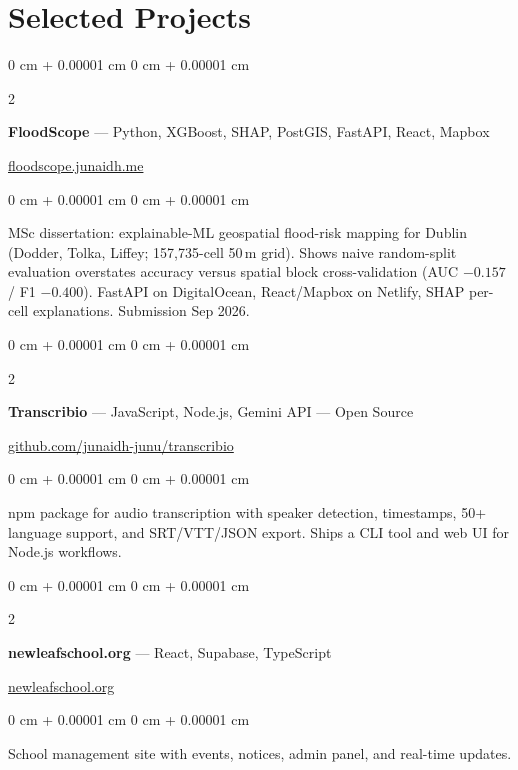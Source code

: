 \documentclass[10pt, a4paper]{article}
\newenvironment{onecolentry}{
    \begin{adjustwidth}{
        0 cm + 0.00001 cm
    }{
        0 cm + 0.00001 cm
    }
}{
    \end{adjustwidth}
}
\newenvironment{twocolentry}[2][]{
    \onecolentry
    \def\secondColumn{#2}
    \setcolumnwidth{\fill, 4.8 cm}
    \begin{paracol}{2}
}{
    \switchcolumn \raggedleft \secondColumn
    \end{paracol}
    \endonecolentry}
\let\hrefWithoutArrow\href
\begin{document}
    \section{Selected Projects}

    \begin{twocolentry}{
        \hrefWithoutArrow{https://floodscope.junaidh.me}{floodscope.junaidh.me}
    }
        \textbf{FloodScope} --- Python, XGBoost, SHAP, PostGIS, FastAPI, React, Mapbox
    \end{twocolentry}
    \vspace{0.05 cm}
    \begin{onecolentry}
        MSc dissertation: explainable-ML geospatial flood-risk mapping for Dublin (Dodder, Tolka, Liffey; 157,735-cell 50\,m grid). Shows naive random-split evaluation overstates accuracy versus spatial block cross-validation (AUC $-0.157$ / F1 $-0.400$). FastAPI on DigitalOcean, React/Mapbox on Netlify, SHAP per-cell explanations. Submission Sep 2026.
    \end{onecolentry}

    \vspace{0.12 cm}

    \begin{twocolentry}{
        \hrefWithoutArrow{https://github.com/junaidh-junu/transcribio}{github.com/junaidh-junu/transcribio}
    }
        \textbf{Transcribio} --- JavaScript, Node.js, Gemini API --- Open Source
    \end{twocolentry}
    \vspace{0.05 cm}
    \begin{onecolentry}
        npm package for audio transcription with speaker detection, timestamps, 50+ language support, and SRT/VTT/JSON export. Ships a CLI tool and web UI for Node.js workflows.
    \end{onecolentry}

    \vspace{0.12 cm}

    \begin{twocolentry}{
        \hrefWithoutArrow{https://newleafschool.org}{newleafschool.org}
    }
        \textbf{newleafschool.org} --- React, Supabase, TypeScript
    \end{twocolentry}
    \vspace{0.05 cm}
    \begin{onecolentry}
        School management site with events, notices, admin panel, and real-time updates.
    \end{onecolentry}
\end{document}
